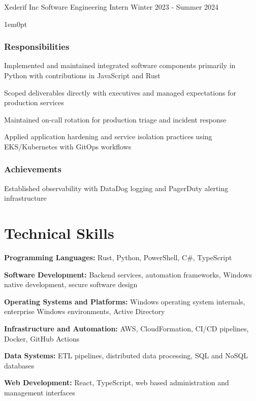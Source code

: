 \documentclass{../styles/cv}
\begin{document}
\subsectionpositiondate
    {Xederif Inc}
    {Software Engineering Intern}
    {Winter 2023 - Summer 2024}

\begin{adjustwidth}{1em}{0pt}
\subsubsection*{Responsibilities}
\resumesublistbegin
    \item Implemented and maintained integrated software components primarily in Python with contributions in JavaScript and Rust
    \item Scoped deliverables directly with executives and managed expectations for production services
    \item Maintained on-call rotation for production triage and incident response
    \item Applied application hardening and service isolation practices using EKS/Kubernetes with GitOps workflows
\resumesublistend

\subsubsection*{Achievements}
\resumesublistbegin
    \item Established observability with DataDog logging and PagerDuty alerting infrastructure
\resumesublistend
\end{adjustwidth}

\section{Technical Skills}
\resumesublistbegin
    \item \textbf{Programming Languages:} Rust, Python, PowerShell, C\#, TypeScript
    \item \textbf{Software Development:} Backend services, automation frameworks, Windows native development, secure software design
    \item \textbf{Operating Systems and Platforms:} Windows operating system internals, enterprise Windows environments, Active Directory
    \item \textbf{Infrastructure and Automation:} AWS, CloudFormation, CI/CD pipelines, Docker, GitHub Actions
    \item \textbf{Data Systems:} ETL pipelines, distributed data processing, SQL and NoSQL databases
    \item \textbf{Web Development:} React, TypeScript, web based administration and management interfaces
\resumesublistend
\end{document}
